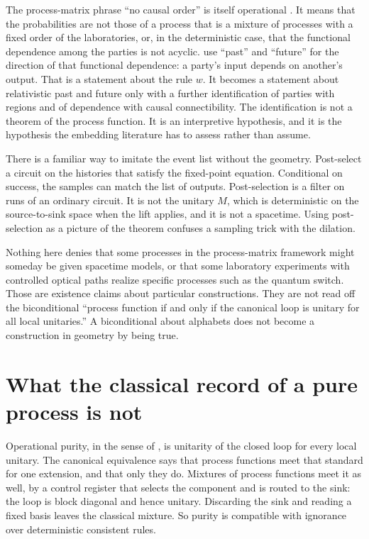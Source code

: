\documentclass[11pt]{article}
\begin{document}
The process-matrix phrase ``no causal order'' is itself operational \citep{oreshkov2012}. It means that the probabilities are not those of a process that is a mixture of processes with a fixed order of the laboratories, or, in the deterministic case, that the functional dependence among the parties is not acyclic. \citet{baumeler2019} use ``past'' and ``future'' for the direction of that functional dependence: a party's input depends on another's output. That is a statement about the rule \(w\). It becomes a statement about relativistic past and future only with a further identification of parties with regions and of dependence with causal connectibility. The identification is not a theorem of the process function. It is an interpretive hypothesis, and it is the hypothesis the embedding literature has to assess rather than assume.

There is a familiar way to imitate the event list without the geometry. Post-select a circuit on the histories that satisfy the fixed-point equation. Conditional on success, the samples can match the list of outputs. Post-selection is a filter on runs of an ordinary circuit. It is not the unitary \(M\), which is deterministic on the source-to-sink space when the lift applies, and it is not a spacetime. Using post-selection as a picture of the theorem confuses a sampling trick with the dilation.

Nothing here denies that some processes in the process-matrix framework might someday be given spacetime models, or that some laboratory experiments with controlled optical paths realize specific processes such as the quantum switch. Those are existence claims about particular constructions. They are not read off the biconditional ``process function if and only if the canonical loop is unitary for all local unitaries.'' A biconditional about alphabets does not become a construction in geometry by being true.

\section{What the classical record of a pure process is not}
\label{sec:wit}

Operational purity, in the sense of \citet{araujo2017}, is unitarity of the closed loop for every local unitary. The canonical equivalence says that process functions meet that standard for one extension, and that only they do. Mixtures of process functions meet it as well, by a control register that selects the component and is routed to the sink: the loop is block diagonal and hence unitary. Discarding the sink and reading a fixed basis leaves the classical mixture. So purity is compatible with ignorance over deterministic consistent rules.
\end{document}
